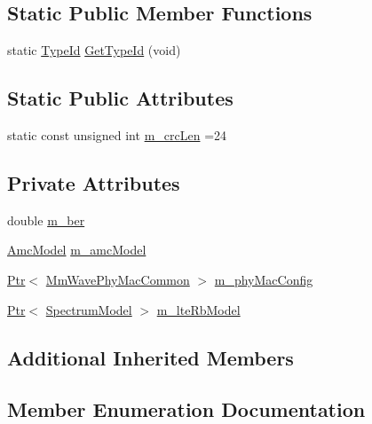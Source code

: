\subsection*{Static Public Member Functions}
\begin{DoxyCompactItemize}
\item 
static \hyperlink{classns3_1_1TypeId}{Type\+Id} \hyperlink{classns3_1_1MmWaveAmc_ae531231147435ab791661559e95703fe}{Get\+Type\+Id} (void)
\end{DoxyCompactItemize}
\subsection*{Static Public Attributes}
\begin{DoxyCompactItemize}
\item 
static const unsigned int \hyperlink{classns3_1_1MmWaveAmc_a11a852907226e549ff50ec3b7248f0ad}{m\+\_\+crc\+Len} =24
\end{DoxyCompactItemize}
\subsection*{Private Attributes}
\begin{DoxyCompactItemize}
\item 
double \hyperlink{classns3_1_1MmWaveAmc_ac0e911c1ebab08ab7c52713ea5b35a15}{m\+\_\+ber}
\item 
\hyperlink{classns3_1_1MmWaveAmc_a2805c1e6b48cb88e9cf86b062e079401}{Amc\+Model} \hyperlink{classns3_1_1MmWaveAmc_a4518d21ebad09825dd22466951c6935b}{m\+\_\+amc\+Model}
\item 
\hyperlink{classns3_1_1Ptr}{Ptr}$<$ \hyperlink{classns3_1_1MmWavePhyMacCommon}{Mm\+Wave\+Phy\+Mac\+Common} $>$ \hyperlink{classns3_1_1MmWaveAmc_ae2bd45429e23c9091597462d888e8d6f}{m\+\_\+phy\+Mac\+Config}
\item 
\hyperlink{classns3_1_1Ptr}{Ptr}$<$ \hyperlink{classns3_1_1SpectrumModel}{Spectrum\+Model} $>$ \hyperlink{classns3_1_1MmWaveAmc_a4c27746a8b0aac6c3915bdd2e2326bac}{m\+\_\+lte\+Rb\+Model}
\end{DoxyCompactItemize}
\subsection*{Additional Inherited Members}


\subsection{Member Enumeration Documentation}
